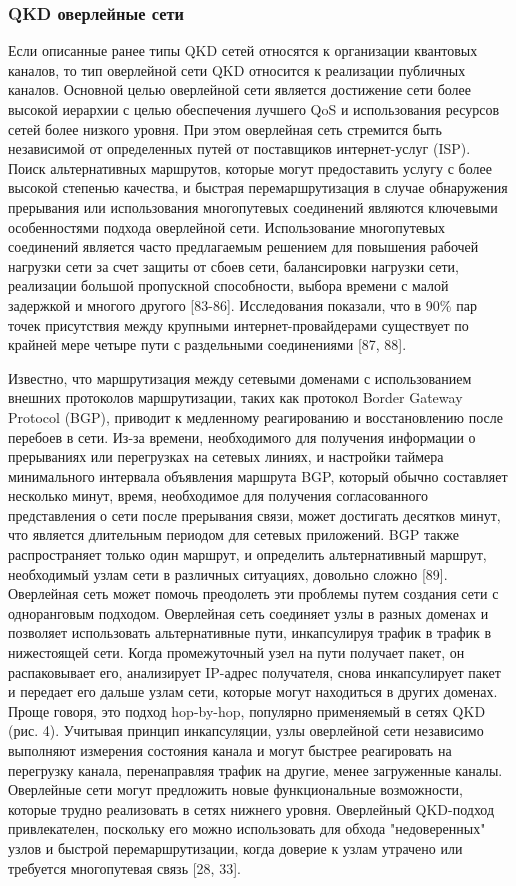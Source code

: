 \subsubsection*{QKD оверлейные сети}
Если описанные ранее типы QKD сетей относятся к организации квантовых каналов, то тип оверлейной сети QKD относится к реализации публичных каналов. Основной целью оверлейной сети является достижение сети более высокой иерархии с целью обеспечения лучшего QoS и использования ресурсов сетей более низкого уровня. При этом оверлейная сеть стремится быть независимой от определенных путей от поставщиков интернет-услуг (ISP). Поиск альтернативных маршрутов, которые могут предоставить услугу с более высокой степенью качества, и быстрая перемаршрутизация в случае обнаружения прерывания или использования многопутевых соединений являются ключевыми особенностями подхода оверлейной сети. Использование многопутевых соединений является часто предлагаемым решением для повышения рабочей нагрузки сети за счет защиты от сбоев сети, балансировки нагрузки сети, реализации большой пропускной способности, выбора времени с малой задержкой и многого другого [83-86]. Исследования показали, что в 90\% пар точек присутствия между крупными интернет-провайдерами существует по крайней мере четыре пути с раздельными соединениями [87, 88].

Известно, что маршрутизация между сетевыми доменами с использованием внешних протоколов маршрутизации, таких как протокол Border Gateway Protocol (BGP), приводит к медленному реагированию и восстановлению после перебоев в сети. Из-за времени, необходимого для получения информации о прерываниях или перегрузках на сетевых линиях, и настройки таймера минимального интервала объявления маршрута BGP, который обычно составляет несколько минут, время, необходимое для получения согласованного представления о сети после прерывания связи, может достигать десятков минут, что является длительным периодом для сетевых приложений. BGP также распространяет только один маршрут, и определить альтернативный маршрут, необходимый узлам сети в различных ситуациях, довольно сложно [89].
Оверлейная сеть может помочь преодолеть эти проблемы путем создания сети с одноранговым подходом. Оверлейная сеть соединяет узлы в разных доменах и позволяет использовать альтернативные пути, инкапсулируя трафик в трафик в нижестоящей сети. Когда промежуточный узел на пути получает пакет, он распаковывает его, анализирует IP-адрес получателя, снова инкапсулирует пакет и передает его дальше узлам сети, которые могут находиться в других доменах. Проще говоря, это подход hop-by-hop, популярно применяемый в сетях QKD (рис. 4). Учитывая принцип инкапсуляции, узлы оверлейной сети независимо выполняют измерения состояния канала и могут быстрее реагировать на перегрузку канала, перенаправляя трафик на другие, менее загруженные каналы. Оверлейные сети могут предложить новые функциональные возможности, которые трудно реализовать в сетях нижнего уровня. Оверлейный QKD-подход привлекателен, поскольку его можно использовать для обхода "недоверенных" узлов и быстрой перемаршрутизации, когда доверие к узлам утрачено или требуется многопутевая связь [28, 33].
